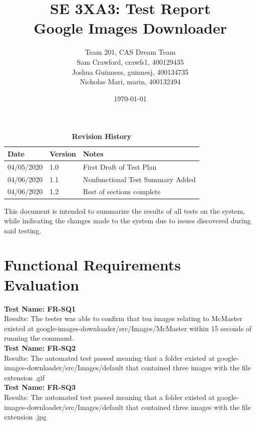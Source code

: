 \documentclass[12pt, titlepage]{article}
\title{SE 3XA3: Test Report\\Google Images Downloader}
\author{Team 201, CAS Dream Team
		\\ Sam Crawford, crawfs1, 400129435
		\\ Joshua Guinness, guinnesj, 400134735
		\\ Nicholas Mari, marin, 400132494
}
\date{\today}
\begin{document}
\maketitle

\tableofcontents
\listoftables
\listoffigures

\begin{table}
\caption{\bf Revision History}
\begin{tabularx}{\textwidth}{p{3cm}p{2cm}X}
\toprule {\bf Date} & {\bf Version} & {\bf Notes}\\
\midrule
04/05/2020 & 1.0 & First Draft of Test Plan\\
04/06/2020 & 1.1 & Nonfunctional Test Summary Added\\
04/06/2020 & 1.2 & Rest of sections complete\\
\bottomrule
\end{tabularx}
\end{table}

\newpage


This document is intended to summarize the results of all tests on the system, while indicating the changes made to the system due to issues discovered during said testing.  

\section{Functional Requirements Evaluation}

\textbf{Test Name: FR-SQ1}\\
Results: The tester was able to confirm that ten images relating to McMaster existed at google-images-downloader/src/Images/McMaster within 15 seconds of running the command.\\

\medskip
\noindent \textbf{Test Name: FR-SQ2}\\
Results: The automated test passed meaning that a folder existed at google-images-downloader/src/Images/default that contained three images with the file extension .gif\\

\medskip
\noindent \textbf{Test Name: FR-SQ3}\\
Results: The automated test passed meaning that a folder existed at google-images-downloader/src/Images/default that contained three images with the file extension .jpg\\
\end{document}
